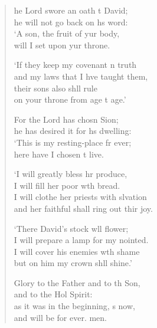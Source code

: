 \begin{verse}
  \begin{patverse}
he Lord swore an oath t David;\Med\\
    he will not go back on h\pointup{\i}s word:\\
‘A son, the fruit of yur body,\Med\\
    will I set upon yur throne.

‘If they keep my covenant \pointup{\i}n truth\Med\\
    and my laws that I hve taught them,\\
their sons also shll rule\Med\\
    on your throne from age t age.’

For the Lord has chosn Sion;\Med\\
    he has desired it for h\pointup{\i}s dwelling:\\
‘This is my resting-place fr ever;\Med\\
    here have I chosen t live.

‘I will greatly bless hr produce,\Med\\
    I will fill her poor w\pointup{\i}th bread.\\
I will clothe her priests with slvation\Med\\
    and her faithful shall ring out thir joy.

‘There David’s stock w\pointup{\i}ll flower;\Med\\
    I will prepare a lamp for my nointed.\\
I will cover his enemies w\pointup{\i}th shame\Med\\
    but on him my crown shll shine.’

Glory to the Father and to th Son,\Med\\
    and to the Hol Spirit:\\
as it was in the beginning, \pointup{\i}s now,\Med\\
    and will be for ever. men.
  \end{patverse}
\end{verse}
